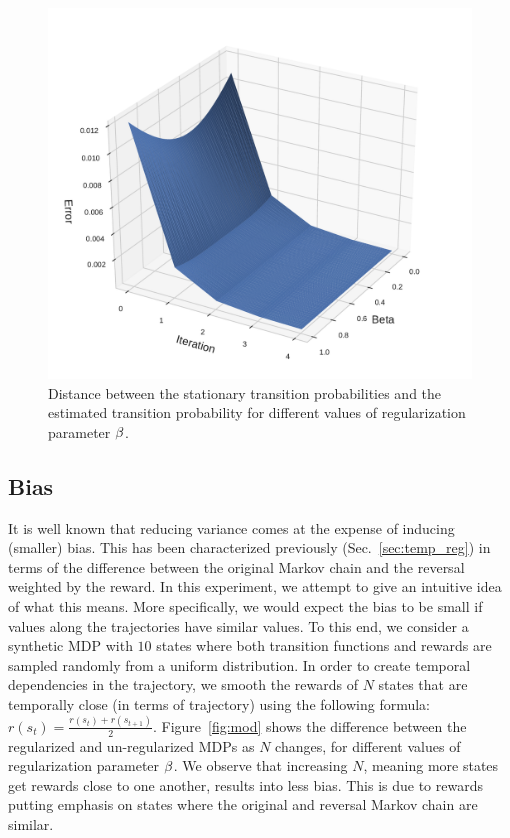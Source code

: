 \begin{figure}
	\centering
	\includegraphics[scale=0.7]{./fig/Markov_mixing.pdf}
\caption{Distance between the stationary transition probabilities and the estimated transition probability for different values of regularization parameter $\beta$.}
\label{fig:mixing}
\end{figure}

\subsection{Bias}
\label{sec:expe:bias}

It is well known that reducing variance comes at the expense of inducing (smaller) bias.
This has been characterized previously (Sec.~\ref{sec:temp_reg}) in terms of the difference between the original Markov chain and the reversal weighted by the reward. In this experiment, we attempt to give an intuitive idea of what this means. More specifically, we would expect the bias to be small if values along the trajectories have similar values.
To this end, we consider a synthetic MDP with $10$ states where both transition functions and rewards are sampled randomly from a uniform distribution. In order to create temporal dependencies in the trajectory, we smooth the rewards of $N$ states that are temporally close (in terms of trajectory) using the following formula: $ r(s_t) = \frac{r(s_t) + r(s_{t+1})}{2}$.
Figure~\ref{fig:mod} shows the difference between the regularized and un-regularized MDPs as $N$ changes, for different values of regularization parameter $\beta$.
We observe that increasing $N$, meaning more states get rewards close to one another, results into less bias. This is due to rewards putting emphasis on states where the original and reversal Markov chain are similar.

